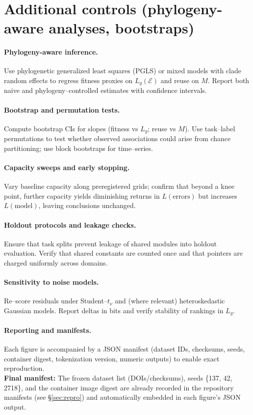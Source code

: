 \documentclass[11pt,a4paper]{article}
\begin{document}
\section{Additional controls (phylogeny-aware analyses, bootstraps)}
\label{app:controls}

\paragraph{Phylogeny-aware inference.}
Use phylogenetic generalized least squares (PGLS) or mixed models with clade random effects to regress fitness proxies on $L_g(\mathcal{E})$ and reuse on $M$. Report both naive and phylogeny–controlled estimates with confidence intervals.

\paragraph{Bootstrap and permutation tests.}
Compute bootstrap CIs for slopes (fitness vs $L_g$; reuse vs $M$). Use task–label permutations to test whether observed associations could arise from chance partitioning; use block bootstraps for time–series.

\paragraph{Capacity sweeps and early stopping.}
Vary baseline capacity along preregistered grids; confirm that beyond a knee point, further capacity yields diminishing returns in $L(\text{errors})$ but increases $L(\text{model})$, leaving conclusions unchanged.

\paragraph{Holdout protocols and leakage checks.}
Ensure that task splits prevent leakage of shared modules into holdout evaluation. Verify that shared constants are counted once and that pointers are charged uniformly across domains.

\paragraph{Sensitivity to noise models.}
Re–score residuals under Student–$t_\nu$ and (where relevant) heteroskedastic Gaussian models. Report deltas in bits and verify stability of rankings in $L_g$.

\paragraph{Reporting and manifests.}
Each figure is accompanied by a JSON manifest (dataset IDs, checksums, seeds, container digest, tokenization version, numeric outputs) to enable exact reproduction.\\[0.25em]
\textbf{Final manifest:} The frozen dataset list (DOIs/checksums), seeds \{137, 42, 2718\}, and the container image digest are already recorded in the repository manifests (see \S\ref{sec:repro}) and automatically embedded in each figure's JSON output.
\end{document}

